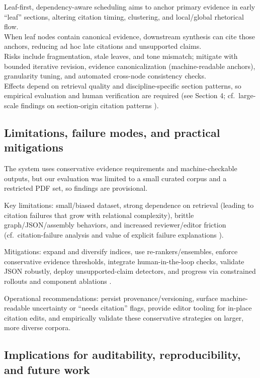 \documentclass{article}%
\begin{document}
%
Leaf-first, dependency-aware scheduling aims to anchor primary evidence in early ``leaf'' sections, altering citation timing, clustering, and local/global rhetorical flow.\\
When leaf nodes contain canonical evidence, downstream synthesis can cite those anchors, reducing ad hoc late citations and unsupported claims.\\
Risks include fragmentation, stale leaves, and tone mismatch; mitigate with bounded iterative revision, evidence canonicalization (machine-readable anchors), granularity tuning, and automated cross-node consistency checks.\\
Effects depend on retrieval quality and discipline-specific section patterns, so empirical evaluation and human verification are required (see Section 4; cf.~large-scale findings on section-origin citation patterns \cite{1903.07547v1}).%

%
\subsection{Limitations, failure modes, and practical mitigations}%


%
The system uses conservative evidence requirements and machine-checkable outputs, but our evaluation was limited to a small curated corpus and a restricted PDF set, so findings are provisional.

Key limitations: small/biased dataset, strong dependence on retrieval (leading to citation failures that grow with relational complexity), brittle graph/JSON/assembly behaviors, and increased reviewer/editor friction (cf.~citation-failure analysis \cite{2510.20303v1} and value of explicit failure explanations \cite{2303.16010v1}).

Mitigations: expand and diversify indices, use re-rankers/ensembles, enforce conservative evidence thresholds, integrate human-in-the-loop checks, validate JSON robustly, deploy unsupported-claim detectors, and progress via constrained rollouts and component ablations \cite{2510.20303v1,2303.16010v1}.

Operational recommendations: persist provenance/versioning, surface machine-readable uncertainty or ``needs citation'' flags, provide editor tooling for in-place citation edits, and empirically validate these conservative strategies on larger, more diverse corpora.%

%
\subsection{Implications for auditability, reproducibility, and future work}%
\end{document}
